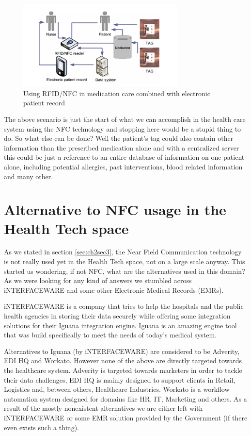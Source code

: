 \begin{figure}
\centering
\includegraphics[width=0.75\textwidth]{figures/nfc_medication_system.png}
\caption{Using RFID/NFC in medication care combined with electronic patient record \cite{lahtela2008rfid}}
\label{fig:nfc-medication-system}
\end{figure}

The above scenario is just the start of what we can accomplish in the health care system using the NFC technology and stopping here would be a stupid thing to do. So what else can be done? Well the patient's tag could also contain other information than the prescribed medication alone and with a centralized server this could be just a reference to an entire database of information on one patient alone, including potential allergies, past interventions, blood related information and many other.

\section{Alternative to NFC usage in the Health Tech space}
\label{sec:ch2sec4}

\par As we stated in section \ref{sec:ch2sec3}, the Near Field Communication technology is not really used yet in the Health Tech space, not on a large scale anyway. This started us wondering, if not NFC, what are the alternatives used in this domain? As we were looking for any kind of answers we stumbled across iNTERFACEWARE and some other Electronic Medical Records (EMRs).

iNTERFACEWARE is a company that tries to help the hospitals and the public health agencies in storing their data securely while offering some integration solutions for their Iguana integration engine. Iguana is an amazing engine tool that was build specifically to meet the needs of today's medical system.

Alternatives to Iguana (by iNTERFACEWARE) are considered to be Adverity, EDI HQ and Workato. However none of the above are directly targeted towards the healthcare system. Adverity is targeted towards marketers in order to tackle their data challenges, EDI HQ is mainly designed to support clients in Retail, Logistics and, between others, Healthcare Industries. Workato is a workflow automation system designed for domains like HR, IT, Marketing and others. As a result of the mostly nonexistent alternatives we are either left with iNTERFACEWARE or some EMR solution provided by the Government (if there even exists such a thing).

